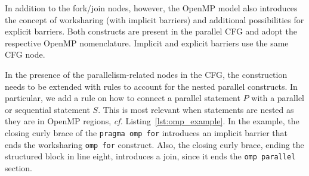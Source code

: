 \documentclass[natbib]{article}
\begin{document}
In addition to the fork/join nodes, however, the OpenMP model also introduces the concept of worksharing (with implicit barriers) and additional possibilities for explicit barriers.
Both constructs are present in the parallel CFG and adopt the respective OpenMP nomenclature.
Implicit and explicit barriers use the same CFG node.

In the presence of the parallelism-related nodes in the CFG, the construction needs to be extended with rules to account for the nested parallel constructs.
In particular, we add a rule on how to connect a parallel statement $P$ with a parallel or sequential statement $S$.
This is most relevant when statements are nested as they are in OpenMP regions, \emph{cf.} Listing~\ref{lst:omp_example}.
In the example, the closing curly brace of the \texttt{pragma omp for} introduces an implicit barrier that ends the worksharing \texttt{omp for} construct.
Also, the closing curly brace, ending the structured block in line eight, introduces a join, since it ends the \texttt{omp parallel} section.
\end{document}
